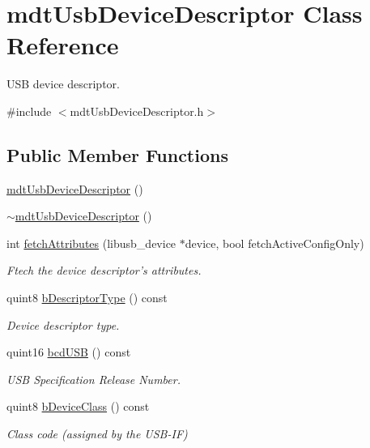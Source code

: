 \hypertarget{classmdt_usb_device_descriptor}{\section{mdt\-Usb\-Device\-Descriptor Class Reference}
\label{classmdt_usb_device_descriptor}
}


U\-S\-B device descriptor.  




{\ttfamily \#include $<$mdt\-Usb\-Device\-Descriptor.\-h$>$}

\subsection*{Public Member Functions}
\begin{DoxyCompactItemize}
\item 
\hyperlink{classmdt_usb_device_descriptor_a56261ab887b96741e5d444e92ed80b35}{mdt\-Usb\-Device\-Descriptor} ()
\item 
\hyperlink{classmdt_usb_device_descriptor_a6362d791f2828ba34fc6f0cb78af93c1}{$\sim$mdt\-Usb\-Device\-Descriptor} ()
\item 
int \hyperlink{classmdt_usb_device_descriptor_a6239e5e56e2e25a686cac98b18158500}{fetch\-Attributes} (libusb\-\_\-device $\ast$device, bool fetch\-Active\-Config\-Only)
\begin{DoxyCompactList}\small\item\em Ftech the device descriptor's attributes. \end{DoxyCompactList}\item 
quint8 \hyperlink{classmdt_usb_device_descriptor_add8de4e1850995461a37ed27b75b4381}{b\-Descriptor\-Type} () const 
\begin{DoxyCompactList}\small\item\em Device descriptor type. \end{DoxyCompactList}\item 
quint16 \hyperlink{classmdt_usb_device_descriptor_ae5f4d1cabe204ca0aa00735d04516e86}{bcd\-U\-S\-B} () const 
\begin{DoxyCompactList}\small\item\em U\-S\-B Specification Release Number. \end{DoxyCompactList}\item 
quint8 \hyperlink{classmdt_usb_device_descriptor_a94e04915c8df9102db54068911b92532}{b\-Device\-Class} () const 
\begin{DoxyCompactList}\small\item\em Class code (assigned by the U\-S\-B-\/\-I\-F) \end{DoxyCompactList}\item 

\end{DoxyCompactItemize}
